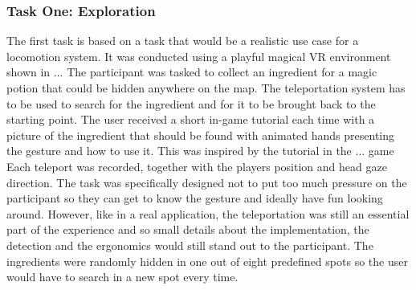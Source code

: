 \subsubsection{Task One: Exploration}
The first task is based on a task that would be a realistic use case for a locomotion system. It was conducted using a playful magical VR environment shown in ... %
The participant was tasked to collect an ingredient for a magic potion that could be hidden anywhere on the map. The teleportation system has to be used to search for the ingredient and for it to be brought back to the starting point. The user received a short in-game tutorial each time with a picture of the ingredient that should be found with animated hands presenting the gesture and how to use it. This was inspired by the tutorial in the ... game %
Each teleport was recorded, together with the players position and head gaze direction. The task was specifically designed not to put too much pressure on the participant so they can get to know the gesture and ideally have fun looking around. However, like in a real application, the teleportation was still an essential part of the experience and so small details about the implementation, the detection and the ergonomics would still stand out to the participant. The ingredients were randomly hidden in one out of eight predefined spots so the user would have to search in a new spot every time.

